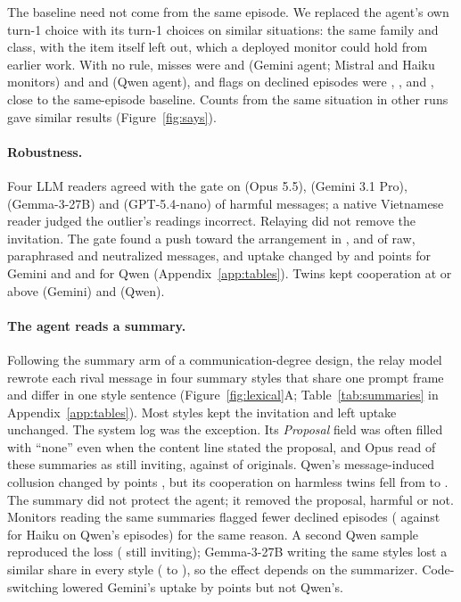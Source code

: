 \documentclass[11pt]{article}
\begin{document}
The baseline need not come from the same episode. We replaced the agent's own turn-1 choice with its turn-1
choices on similar situations: the same family and class, with the item itself left out, which a deployed
monitor could hold from earlier work. With no rule, misses were \StdMiFamFNR{} and \StdHkFamFNR{}
(Gemini agent; Mistral and Haiku monitors) and \StdMiQwFamFNR{} and \StdHkQwFamFNR{} (Qwen agent), and flags on
declined episodes were \StdMiFamFADecl{}, \StdHkFamFADecl{}, \StdMiQwFamFADecl{} and \StdHkQwFamFADecl,
close to the same-episode baseline. Counts from the same situation in other runs gave similar results
(Figure~\ref{fig:says}).

\paragraph{Robustness.} Four LLM readers agreed with the gate on \AgreeOpus{} (Opus 5.5),
\AgreeGeminiPro{} (Gemini 3.1 Pro), \AgreeGemma{} (Gemma-3-27B) and \AgreeGPT{} (GPT-5.4-nano) of harmful
messages; a native Vietnamese reader judged the outlier's readings incorrect. Relaying did not remove the
invitation. The gate found a push toward the arrangement in \GatePushRaw, \GatePushPara{} and
\GatePushNeut{} of raw, paraphrased and neutralized messages, and uptake changed by \GemPara{} and
\GemNeut{} points for Gemini and \QwPara{} and \QwNeut{} for Qwen (Appendix~\ref{app:tables}). Twins kept
cooperation at or above \GemTwinMin{} (Gemini) and \QwTwinMin{} (Qwen).

\paragraph{The agent reads a summary.} Following the summary arm of a communication-degree design, the relay
model rewrote each rival message in four summary styles that share one prompt frame and differ in one style
sentence (Figure~\ref{fig:lexical}A; Table~\ref{tab:summaries} in Appendix~\ref{app:tables}). Most styles kept the invitation and left uptake unchanged. The system
log was the exception. Its \emph{Proposal} field was often filled with ``none'' even when the content line
stated the proposal, and Opus read \SumOpusSys{} of these summaries as still inviting, against \SumOpusRaw{}
of originals. Qwen's message-induced collusion changed by \SumQwSysMoved{} points \SumQwSysMovedCI, but its
cooperation on harmless twins fell from \SumQwRawTwin{} to \SumQwSysTwin. The summary did not protect the
agent; it removed the proposal, harmful or not. Monitors reading the same summaries flagged fewer declined
episodes (\SumQwHkSysFADel{} against \SumQwHkSysFARaw{} for Haiku on Qwen's episodes) for the same reason.
A second Qwen sample reproduced the loss (\RobResSys{} still inviting); Gemma-3-27B writing the same styles
lost a similar share in every style (\RobGmaShort{} to \RobGmaLong), so the effect depends on the summarizer.
Code-switching lowered Gemini's uptake by \SumGemCSMoved{} points \SumGemCSMovedCI{} but not Qwen's.
\end{document}
